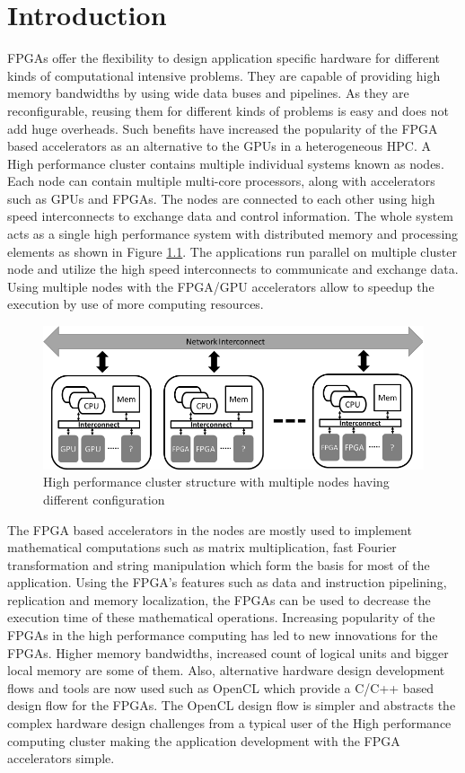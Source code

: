 \chapter{Introduction}
\label{cha:Introduction}

FPGAs offer the flexibility to design application specific hardware
for different kinds of computational intensive problems. They are capable
of providing high memory bandwidths by using wide data buses and pipelines.
As they are reconfigurable, reusing them for different kinds of problems
is easy and does not add huge overheads. Such benefits have increased
the popularity of the FPGA based accelerators as an alternative to the
GPUs in a heterogeneous \ac{HPC}.
A High performance cluster contains multiple individual
systems known as nodes. Each node can contain multiple multi-core processors,
along with accelerators such as GPUs and FPGAs. The nodes are connected to each other
using high speed interconnects to exchange data and control information. The whole system acts
as a single high performance system with distributed memory and processing elements as
shown in Figure \ref{fig:cluster}. The applications run parallel on multiple cluster node
and utilize the high speed interconnects to communicate and exchange data. Using
multiple nodes with the FPGA/GPU accelerators allow to speedup the execution by use of more computing resources.
\begin{figure}[ht]%
    \centering
    \includegraphics[width=1.0\textwidth]{images/cluster}
    \caption{High performance cluster structure with multiple nodes having different configuration}
    \label{fig:cluster}
\end{figure}

The FPGA based accelerators in the nodes are mostly used to implement mathematical computations such
as matrix multiplication, fast Fourier transformation and string manipulation which form the
basis for most of the application. Using the FPGA's features such as data and instruction pipelining,
replication and memory localization, the FPGAs can be used to decrease the execution time of
these mathematical operations. Increasing popularity of the FPGAs in the high performance
computing has led to new innovations for the FPGAs. Higher memory bandwidths, increased count
of logical units and bigger local memory are some of them. Also, alternative hardware design development
flows and tools are now used such as OpenCL which provide a C/C++ based design flow for
the FPGAs. The OpenCL design flow is simpler and abstracts the complex hardware design
challenges from a typical user of the High performance computing cluster making
the application development with the FPGA accelerators simple.

